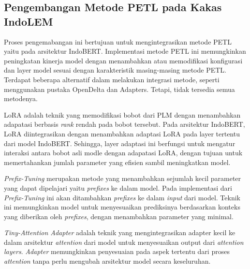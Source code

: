 \subsection{Pengembangan Metode PETL pada Kakas IndoLEM}

Proses pengemabangan ini bertujuan untuk mengintegrasikan metode PETL yaitu \methodPETL pada arsitektur IndoBERT. Implementasi metode PETL ini memungkinkan peningkatan kinerja model dengan menambahkan atau memodifikasi konfigurasi dan layer model sesuai dengan karakteristik masing-masing metode PETL. Terdapat beberapa alternatif dalam melakukan integrasi metode, seperti menggunakan pustaka OpenDelta dan Adapters. Tetapi, tidak tersedia semua metodenya.

LoRA adalah teknik yang memodifikasi bobot dari PLM  dengan menambahkan adapatasi berbasis \textit{rank} rendah pada bobot tersebut. Pada arsitektur IndoBERT, LoRA diintegrasikan dengan menambahkan adaptasi LoRA pada layer tertentu dari model IndoBERT. Sehingga, layer adaptasi ini berfungsi untuk mengatur interaksi antara bobot asli modle dengan adapatasi LoRA, dengan tujuan untuk memertahankan jumlah parameter yang efisien sambil meningkatkan model.

\textit{Prefix-Tuning} merupakan metode yang menambahkan sejumlah kecil parameter yang dapat dipelajari yaitu \textit{prefixes} ke dalam model. Pada implementasi dari \textit{Prefix-Tuning} ini akan ditambahkan \textit{prefixes} ke dalam \textit{input} dari model. Teknik ini memungkinkan model untuk menyesuaikan prediksinya berdasarkan konteks yang diberikan oleh \textit{prefixes}, dengan menambahkan parameter yang minimal. 

\textit{Tiny-Attention Adapter} adalah teknik yang mengintegrasikan adapter kecil ke dalam arsitektur \textit{attention} dari model untuk menyesuaikan output dari \textit{attention layers}. \textit{Adapter} memungkinkan penyesuaian pada aspek tertentu dari proses \textit{attention} tanpa perlu mengubah arsitektur model secara keseluruhan.

